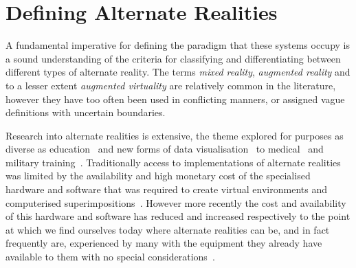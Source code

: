 

\section{Defining Alternate Realities}
A fundamental imperative for defining the paradigm that these systems occupy is a sound understanding of the criteria for classifying and differentiating between different types of alternate reality. The terms \textit{mixed reality}, \textit{augmented reality} and to a lesser extent \textit{augmented virtuality} are relatively common in the literature, however they have too often been used in conflicting manners, or assigned vague definitions with uncertain boundaries.


Research into alternate realities is extensive, the theme explored for purposes as diverse as education~\cite{Warburton2009} and new forms of data visualisation~\cite{Coleman2009} to medical~\cite{TenEyck2011} and military training~\cite{Qiu2009}. Traditionally access to implementations of alternate realities was limited by the availability and high monetary cost of the specialised hardware and software that was required to create virtual environments and computerised superimpositions~\cite{Druck2006}. However more recently the cost and availability of this hardware and software has reduced and increased respectively to the point at which we find ourselves today where alternate realities can be, and in fact frequently are, experienced by many with the equipment they already have available to them with no special considerations~\cite{Sevan2008}.

